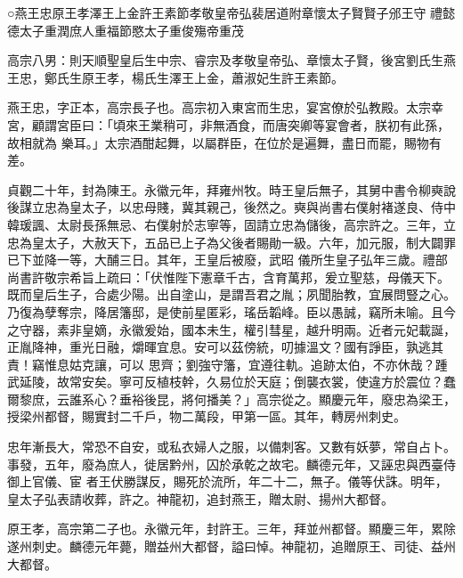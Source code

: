
\begin{pinyinscope}

 ○燕王忠原王孝澤王上金許王素節孝敬皇帝弘裴居道附章懷太子賢賢子邠王守
 禮懿德太子重潤庶人重福節愍太子重俊殤帝重茂



 高宗八男：則天順聖皇后生中宗、睿宗及孝敬皇帝弘、章懷太子賢，後宮劉氏生燕王忠，鄭氏生原王孝，楊氏生澤王上金，蕭淑妃生許王素節。



 燕王忠，字正本，高宗長子也。高宗初入東宮而生忠，宴宮僚於弘教殿。太宗幸宮，顧謂宮臣曰：「頃來王業稍可，非無酒食，而唐突卿等宴會者，朕初有此孫，故相就為
 樂耳。」太宗酒酣起舞，以屬群臣，在位於是遍舞，盡日而罷，賜物有差。



 貞觀二十年，封為陳王。永徽元年，拜雍州牧。時王皇后無子，其舅中書令柳奭說後謀立忠為皇太子，以忠母賤，冀其親己，後然之。奭與尚書右僕射褚遂良、侍中韓瑗諷、太尉長孫無忌、右僕射於志寧等，固請立忠為儲後，高宗許之。三年，立忠為皇太子，大赦天下，五品已上子為父後者賜勛一級。六年，加元服，制大闢罪已下並降一等，大酺三日。其年，王皇后被廢，武昭
 儀所生皇子弘年三歲。禮部尚書許敬宗希旨上疏曰：「伏惟陛下憲章千古，含育萬邦，爰立聖慈，母儀天下。既而皇后生子，合處少陽。出自塗山，是謂吾君之胤；夙聞胎教，宜展問豎之心。乃復為孽奪宗，降居籓邸，是使前星匿彩，瑤岳韜峰。臣以愚誠，竊所未喻。且今之守器，素非皇嫡，永徽爰始，國本未生，權引彗星，越升明兩。近者元妃載誕，正胤降神，重光日融，爝暉宜息。安可以茲傍統，叨據溫文？國有諍臣，孰逃其責！竊惟息姑克讓，可以
 思齊；劉強守籓，宜遵往軌。追跡太伯，不亦休哉？踵武延陵，故常安矣。寧可反植枝幹，久易位於天庭；倒襲衣裳，使違方於震位？蠢爾黎庶，云誰系心？垂裕後昆，將何播美？」高宗從之。顯慶元年，廢忠為梁王，授梁州都督，賜實封二千戶，物二萬段，甲第一區。其年，轉房州刺史。



 忠年漸長大，常恐不自安，或私衣婦人之服，以備刺客。又數有妖夢，常自占卜。事發，五年，廢為庶人，徙居黔州，囚於承乾之故宅。麟德元年，又誣忠與西臺侍御上官儀、宦
 者王伏勝謀反，賜死於流所，年二十二，無子。儀等伏誅。明年，皇太子弘表請收葬，許之。神龍初，追封燕王，贈太尉、揚州大都督。



 原王孝，高宗第二子也。永徽元年，封許王。三年，拜並州都督。顯慶三年，累除遂州刺史。麟德元年薨，贈益州大都督，謚曰悼。神龍初，追贈原王、司徒、益州大都督。




\end{pinyinscope}
